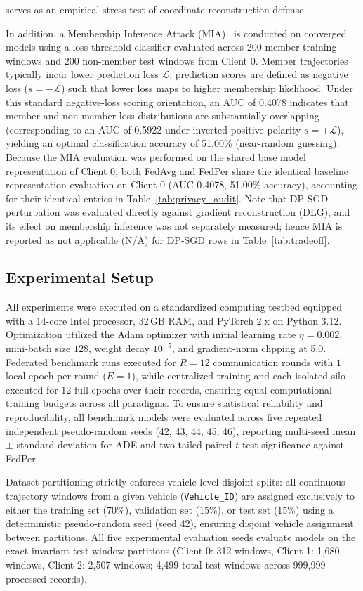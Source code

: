 \documentclass[journal]{IEEEtran}
\begin{document}
serves as an empirical stress test of coordinate reconstruction defense.

In addition, a Membership Inference Attack (MIA)~\cite{shokri2017membership} is conducted on converged models using a loss-threshold classifier evaluated across 200 member training windows and 200 non-member test windows from Client 0. Member trajectories typically incur lower prediction loss $\mathcal{L}$; prediction scores are defined as negative loss ($s = -\mathcal{L}$) such that lower loss maps to higher membership likelihood. Under this standard negative-loss scoring orientation, an AUC of 0.4078 indicates that member and non-member loss distributions are substantially overlapping (corresponding to an AUC of 0.5922 under inverted positive polarity $s = +\mathcal{L}$), yielding an optimal classification accuracy of 51.00\% (near-random guessing). Because the MIA evaluation was performed on the shared base model representation of Client 0, both FedAvg and FedPer share the identical baseline representation evaluation on Client 0 (AUC 0.4078, 51.00\% accuracy), accounting for their identical entries in Table~\ref{tab:privacy_audit}. Note that DP-SGD perturbation was evaluated directly against gradient reconstruction (DLG), and its effect on membership inference was not separately measured; hence MIA is reported as not applicable (N/A) for DP-SGD rows in Table~\ref{tab:tradeoff}.

\subsection{Experimental Setup}
\label{sec:experimental_setup}
All experiments were executed on a standardized computing testbed equipped with a 14-core Intel processor, 32\,GB RAM, and PyTorch 2.x on Python 3.12. Optimization utilized the Adam optimizer with initial learning rate $\eta = 0.002$, mini-batch size $128$, weight decay $10^{-5}$, and gradient-norm clipping at 5.0. Federated benchmark runs executed for $R = 12$ communication rounds with $1$ local epoch per round ($E=1$), while centralized training and each isolated silo executed for 12 full epochs over their records, ensuring equal computational training budgets across all paradigms. To ensure statistical reliability and reproducibility, all benchmark models were evaluated across five repeated independent pseudo-random seeds (42, 43, 44, 45, 46), reporting multi-seed mean $\pm$ standard deviation for ADE and two-tailed paired $t$-test significance against FedPer.

Dataset partitioning strictly enforces vehicle-level disjoint splits: all continuous trajectory windows from a given vehicle (\texttt{Vehicle\_ID}) are assigned exclusively to either the training set (70\%), validation set (15\%), or test set (15\%) using a deterministic pseudo-random seed (seed 42), ensuring disjoint vehicle assignment between partitions. All five experimental evaluation seeds evaluate models on the exact invariant test window partitions (Client 0: 312 windows, Client 1: 1,680 windows, Client 2: 2,507 windows; 4,499 total test windows across 999,999 processed records).
\end{document}
